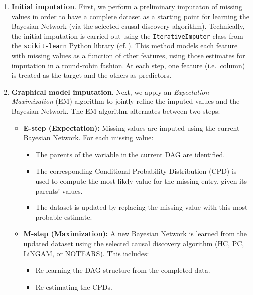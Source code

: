 \documentclass[
]{article}
\providecommand{\tightlist}{%
  \setlength{\itemsep}{0pt}\setlength{\parskip}{0pt}}\usepackage{longtable,booktabs,array}
\theoremstyle{definition}
\theoremstyle{remark}
\begin{document}
\begin{enumerate}
\def\labelenumi{\arabic{enumi}.}
\item
  \textbf{Initial imputation}. First, we perform a preliminary imputaton
  of missing values in order to have a complete dataset as a starting
  point for learning the Bayesian Network (via the selected causal
  discovery algorithm). Technically, the initial imputation is carried
  out using the \texttt{IterativeImputer} class from the
  \texttt{scikit-learn} Python library (cf.
  ). This method models each
  feature with missing values as a function of other features, using
  those estimates for imputation in a round-robin fashion. At each step,
  one feature (i.e.~column) is treated as the target and the others as
  predictors.
\item
  \textbf{Graphical model imputation}. Next, we apply an
  \emph{Expectation-Maximization} (EM) algorithm to jointly refine the
  imputed values and the Bayesian Network. The EM algorithm alternates
  between two steps:

  \begin{itemize}
  \tightlist
  \item
    \textbf{E-step (Expectation):} Missing values are imputed using the
    current Bayesian Network. For each missing value:

    \begin{itemize}
    \tightlist
    \item
      The parents of the variable in the current DAG are identified.
    \item
      The corresponding Conditional Probability Distribution (CPD) is
      used to compute the most likely value for the missing entry, given
      its parents' values.
    \item
      The dataset is updated by replacing the missing value with this
      most probable estimate.
    \end{itemize}
  \item
    \textbf{M-step (Maximization):} A new Bayesian Network is learned
    from the updated dataset using the selected causal discovery
    algorithm (HC, PC, LiNGAM, or NOTEARS). This includes:

    \begin{itemize}
    \tightlist
    \item
      Re-learning the DAG structure from the completed data.
    \item
      Re-estimating the CPDs.
    \end{itemize}
  \end{itemize}
\end{enumerate}
\end{document}
